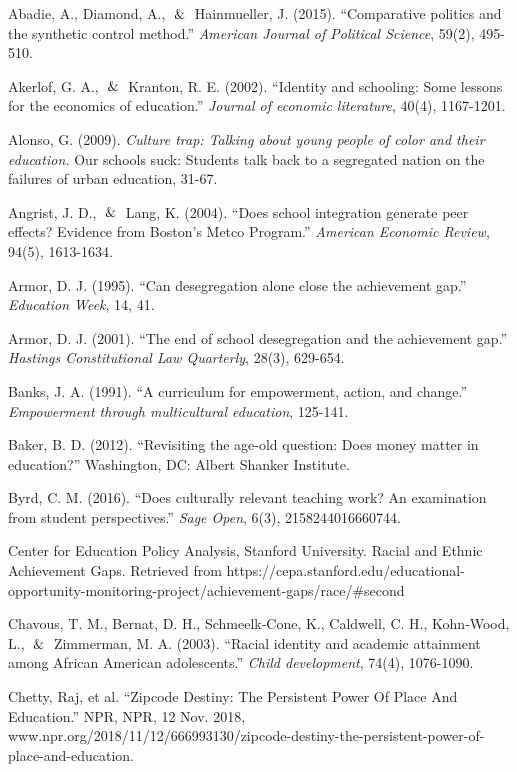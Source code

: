 \begin{hangparas}{.25in}{1}
Abadie, A., Diamond, A., $\And$ Hainmueller, J. (2015). “Comparative politics and the synthetic control method.” \textit{American Journal of Political Science}, 59(2), 495-510.

Akerlof, G. A., $\And$ Kranton, R. E. (2002). “Identity and schooling: Some lessons for the economics of education.” \textit{Journal of economic literature}, 40(4), 1167-1201.

Alonso, G. (2009). \textit{Culture trap: Talking about young people of color and their education.} Our schools suck: Students talk back to a segregated nation on the failures of urban education, 31-67.

Angrist, J. D., $\And$ Lang, K. (2004). “Does school integration generate peer effects? Evidence from Boston's Metco Program.” \textit{American Economic Review}, 94(5), 1613-1634.

Armor, D. J. (1995). “Can desegregation alone close the achievement gap.” \textit{Education Week}, 14, 41.

Armor, D. J. (2001). “The end of school desegregation and the achievement gap.” \textit{Hastings Constitutional Law Quarterly}, 28(3), 629-654.

Banks, J. A. (1991). “A curriculum for empowerment, action, and change.” \textit{Empowerment through multicultural education}, 125-141.

Baker, B. D. (2012). “Revisiting the age-old question: Does money matter in education?” Washington, DC: Albert Shanker Institute.

Byrd, C. M. (2016). “Does culturally relevant teaching work? An examination from student perspectives.” \textit{Sage Open}, 6(3), 2158244016660744. 

Center for Education Policy Analysis, Stanford University. Racial and Ethnic Achievement Gaps. Retrieved from https://cepa.stanford.edu/educational-opportunity-monitoring-project/achievement-gaps/race/#second

Chavous, T. M., Bernat, D. H., Schmeelk‐Cone, K., Caldwell, C. H., Kohn‐Wood, L., $\And$ Zimmerman, M. A. (2003). “Racial identity and academic attainment among African American adolescents.” \textit{Child development}, 74(4), 1076-1090.

Chetty, Raj, et al. “Zipcode Destiny: The Persistent Power Of Place And Education.” NPR, NPR, 12 Nov. 2018, www.npr.org/2018/11/12/666993130/zipcode-destiny-the-persistent-power-of-place-and-education. 


\end{hangparas}
